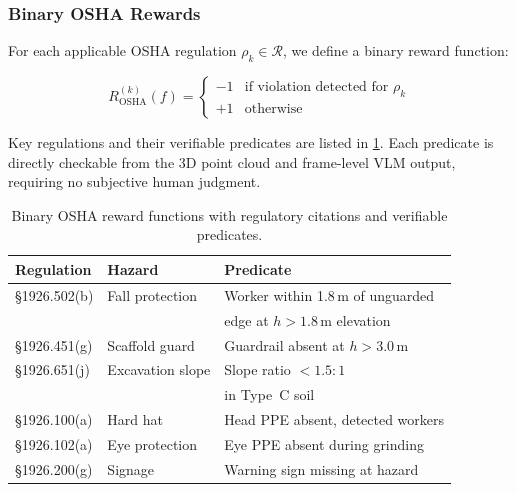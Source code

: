 \documentclass[sigconf,nonacm]{acmart}
\begin{document}
\subsubsection{Binary OSHA Rewards}

For each applicable OSHA regulation $\rho_k \in \mathcal{R}$, we define a
binary reward function:

\begin{equation}
  R_{\text{OSHA}}^{(k)}(f) =
  \begin{cases}
    -1 & \text{if violation detected for } \rho_k \\
    +1 & \text{otherwise}
  \end{cases}
  \label{eq:binary_reward}
\end{equation}

Key regulations and their verifiable predicates are listed in
\cref{tab:osha_rewards}.
Each predicate is directly checkable from the 3D point cloud and
frame-level VLM output, requiring no subjective human judgment.

\begin{table}[t]
  \centering
  \caption{Binary OSHA reward functions with regulatory citations and
           verifiable predicates.}
  \label{tab:osha_rewards}
  \small
  \begin{tabular}{@{}lll@{}}
    \toprule
    \textbf{Regulation} & \textbf{Hazard} & \textbf{Predicate} \\
    \midrule
    \S1926.502(b) & Fall protection & Worker within 1.8\,m of unguarded \\
                  &                 & edge at $h > 1.8$\,m elevation \\
    \addlinespace
    \S1926.451(g) & Scaffold guard  & Guardrail absent at $h > 3.0$\,m \\
    \addlinespace
    \S1926.651(j) & Excavation slope & Slope ratio $< 1.5{:}1$ \\
                  &                  & in Type~C soil \\
    \addlinespace
    \S1926.100(a) & Hard hat        & Head PPE absent, detected workers \\
    \addlinespace
    \S1926.102(a) & Eye protection  & Eye PPE absent during grinding \\
    \addlinespace
    \S1926.200(g) & Signage         & Warning sign missing at hazard \\
    \bottomrule
  \end{tabular}
\end{table}
\end{document}
